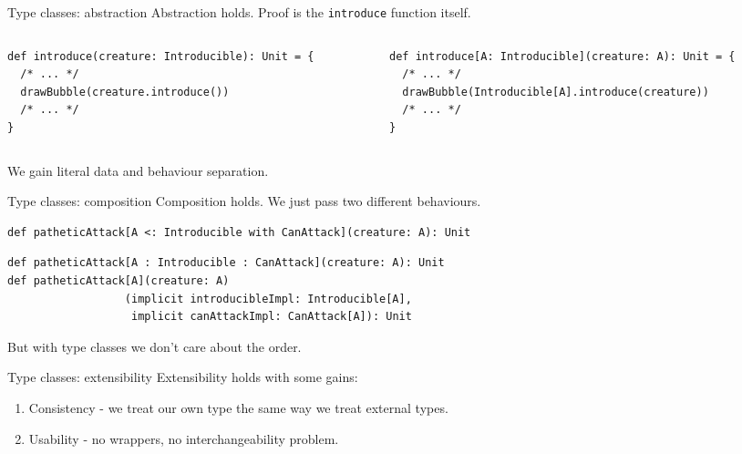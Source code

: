 \documentclass[presentation,aspectratio=169,smaller]{beamer}
\begin{document}
\begin{frame}[label={sec:org397ba81},fragile]{Type classes: abstraction}
 Abstraction holds. Proof is the \texttt{introduce} function itself.

\pause

\begin{columns}
\begin{column}[t]{0.5\columnwidth}
\begin{verbatim}
def introduce(creature: Introducible): Unit = {
  /* ... */
  drawBubble(creature.introduce())
  /* ... */
}
\end{verbatim}
\end{column}

\begin{column}[t]{0.5\columnwidth}
\begin{verbatim}
def introduce[A: Introducible](creature: A): Unit = {
  /* ... */
  drawBubble(Introducible[A].introduce(creature))
  /* ... */
}
\end{verbatim}

\pause
\end{column}
\end{columns}

We gain literal data and behaviour separation.
\end{frame}

\begin{frame}[label={sec:org517889c},fragile]{Type classes: composition}
 Composition holds. We just pass two different behaviours.

\pause

\begin{verbatim}
def patheticAttack[A <: Introducible with CanAttack](creature: A): Unit
\end{verbatim}

\pause

\begin{verbatim}
def patheticAttack[A : Introducible : CanAttack](creature: A): Unit
def patheticAttack[A](creature: A)
                  (implicit introducibleImpl: Introducible[A],
                   implicit canAttackImpl: CanAttack[A]): Unit
\end{verbatim}

\pause

But with type classes we don't care about the order.
\end{frame}

\begin{frame}[label={sec:orgac438cc}]{Type classes: extensibility}
Extensibility holds with some gains:

\begin{enumerate}
\item Consistency - we treat our own type the same way we treat external types.
\item Usability - no wrappers, no interchangeability problem.
\end{enumerate}
\end{frame}
\end{document}
